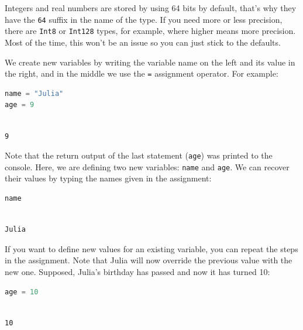 \documentclass[
  notoc %
]{tufte-book}
\newcommand{\passthrough}[1]{#1}
\begin{document}
Integers and real numbers are stored by using 64 bits by default, that's
why they have the \passthrough{\lstinline!64!} suffix in the name of the
type. If you need more or less precision, there are
\passthrough{\lstinline!Int8!} or \passthrough{\lstinline!Int128!}
types, for example, where higher means more precision. Most of the time,
this won't be an issue so you can just stick to the defaults.

We create new variables by writing the variable name on the left and its
value in the right, and in the middle we use the
\passthrough{\lstinline!=!} assignment operator. For example:

\begin{lstlisting}[language=Julia]
name = "Julia"
age = 9
\end{lstlisting}

\begin{lstlisting}[language=Output]

9

\end{lstlisting}

Note that the return output of the last statement
(\passthrough{\lstinline!age!}) was printed to the console. Here, we are
defining two new variables: \passthrough{\lstinline!name!} and
\passthrough{\lstinline!age!}. We can recover their values by typing the
names given in the assignment:

\begin{lstlisting}[language=Julia]
name
\end{lstlisting}

\begin{lstlisting}[language=Output]

Julia

\end{lstlisting}

If you want to define new values for an existing variable, you can
repeat the steps in the assignment. Note that Julia will now override
the previous value with the new one. Supposed, Julia's birthday has
passed and now it has turned 10:

\begin{lstlisting}[language=Julia]
age = 10
\end{lstlisting}

\begin{lstlisting}[language=Output]

10

\end{lstlisting}
\end{document}
